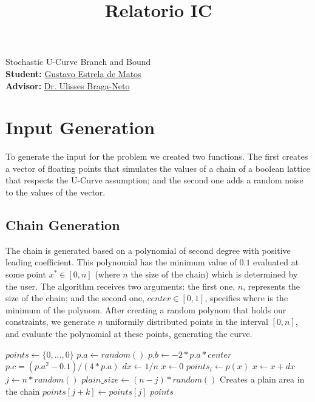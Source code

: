 \documentclass[12pt]{article}
\title{Relatorio IC}
\begin{document}
\begin{center}
{\Large Stochastic U-Curve Branch and Bound \\}
\bigskip
{\bf Student:} \href{mailto:estrela.gustavo.matos@gmail.com}{Gustavo Estrela de Matos} \\
        {\bf Advisor:} \href{mailto:ulisses@ece.tamu.edu}{Dr. Ulisses Braga-Neto}
\end{center}

\section{Input Generation}
To generate the input for the problem we created two functions. The first creates a vector of floating points that simulates the values of a chain of a boolean lattice that respects the U-Curve assumption; and the second one adds a random noise to the values of the vector.

\subsection{Chain Generation}
The chain is generated based on a polynomial of second degree with positive leading coefficient. This polynomial has the minimum value of $0.1$ evaluated at some point $x^* \in [0, n]$ (where $n$ the size of the chain) which is determined by the user. The algorithm receives two arguments: the first one, $n$, represents the size of the chain; and the second one, $center \in [0, 1]$, specifies where is the minimum of the polynom. After creating a random polynom that holds our constraints, we generate $n$ uniformily distributed points in the interval $[0, n]$, and evaluate the polynomial at these points, generating the curve.

\begin{algorithm}[t]
\caption{U-Curve Input Creator}
\begin{algorithmic}[1]
    \State $points \gets \{0, ..., 0\}$
    \State $p.a \gets random ()$
    \State $p.b \gets -2 * p.a * center$
    \State $p.c = (p.a^2 - 0.1) / (4 * p.a)$
    \State $dx \gets 1 / n$
    \State $x \gets 0$
        \State $points_i \gets p (x)$
        \State $x \gets x + dx$
    \EndFor
    \State $j \gets n * random ()$
    \State $plain\_size \gets (n - j) * random ()$
     \Comment Creates a plain area in the chain
        \State $points[j + k] \gets points[j]$
    \EndFor
    \State
    \Return $points$
\EndProcedure
\end{algorithmic}
\end{algorithm}
\end{document}
